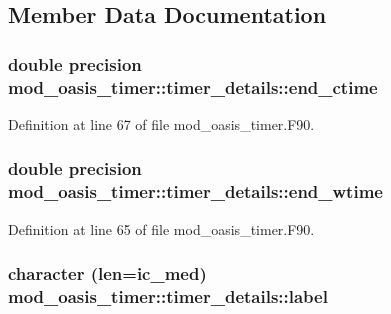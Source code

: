 \subsection{Member Data Documentation}
\hypertarget{structmod__oasis__timer_1_1timer__details_a6203f13dc289b25e994b08b837636afc}{
\subsubsection[{end\+\_\+ctime}]{\setlength{\rightskip}{0pt plus 5cm}double precision mod\+\_\+oasis\+\_\+timer\+::timer\+\_\+details\+::end\+\_\+ctime\hspace{0.3cm}{\ttfamily [private]}}}\label{structmod__oasis__timer_1_1timer__details_a6203f13dc289b25e994b08b837636afc}


Definition at line 67 of file mod\+\_\+oasis\+\_\+timer.\+F90.

\hypertarget{structmod__oasis__timer_1_1timer__details_af4ddda3c6547e993f367a5221671c50b}{
\subsubsection[{end\+\_\+wtime}]{\setlength{\rightskip}{0pt plus 5cm}double precision mod\+\_\+oasis\+\_\+timer\+::timer\+\_\+details\+::end\+\_\+wtime\hspace{0.3cm}{\ttfamily [private]}}}\label{structmod__oasis__timer_1_1timer__details_af4ddda3c6547e993f367a5221671c50b}


Definition at line 65 of file mod\+\_\+oasis\+\_\+timer.\+F90.

\hypertarget{structmod__oasis__timer_1_1timer__details_a772c22856aef70d86030ba7aed99f85d}{
\subsubsection[{label}]{\setlength{\rightskip}{0pt plus 5cm}character (len=ic\+\_\+med) mod\+\_\+oasis\+\_\+timer\+::timer\+\_\+details\+::label\hspace{0.3cm}{\ttfamily [private]}}}\label{structmod__oasis__timer_1_1timer__details_a772c22856aef70d86030ba7aed99f85d}


